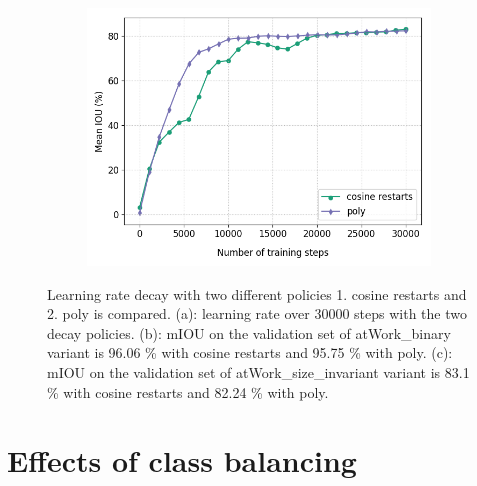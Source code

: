 \begin{figure}
\begin{subfigure}{.3\textwidth}
			\includegraphics[width=1\linewidth]{images/lr_size}
			\caption{}
		\end{subfigure}
		\caption{Learning rate decay with two different policies 1. cosine restarts and 2. poly is compared. (a): learning rate over 30000 steps with the two decay policies. (b): mIOU on the validation set of atWork\_binary variant is 96.06 \% with cosine restarts and 95.75 \% with poly. (c): mIOU on the validation set of atWork\_size\_invariant variant is 83.1 \% with cosine restarts and 82.24 \% with poly.}
		\label{Fig:lr}
	\end{figure}

\section{Effects of class balancing}


